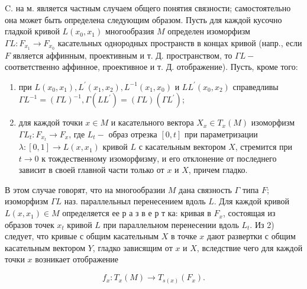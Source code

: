 \documentclass[10pt]{article}
\begin{document}
C. на м. является частным случаем общего понятия связности; самостоятельно она может быть определена следующим образом. Пусть для каждой кусочно гладкой кривой $L\left(x_{0}, x_{1}\right)$ многообразия $M$ определен изоморфизм $\Gamma L: F_{x_{1}} \rightarrow F_{x_{0}}$ касательных однородных пространств в концах кривой (напр., если $F$ является аффинным, проективным и т. Д. пространством, то $\Gamma L-$ соответственно аффинное, проективное и т. Д. отображение). Пусть, кроме того:



\begin{enumerate}

  \item при $L\left(x_{0}, x_{1}\right), L^{\prime}\left(x_{1}, x_{2}\right), L^{-1}\left(x_{1}, x_{0}\right)$ и $L L^{\prime}\left(x_{0}, x_{2}\right)$ справедливы $\Gamma L^{-1}=(\Gamma L)^{-1}, \Gamma\left(L L^{\prime}\right)=(\Gamma L)\left(\Gamma L^{\prime}\right)$;



  \item для каждой точки $x \in M$ и касательного вектора $X_{x} \in T_{x}(M)$ изоморфизм $\Gamma L_{t}: F_{x_{t}} \rightarrow F_{x}$, где $L_{t}-$ образ отрезка $[0, t]$ при параметризации $\lambda:[0,1] \rightarrow L\left(x, x_{1}\right)$ кривой $L$ с касательным вектором $X$, стремится при $t \rightarrow 0$ к тождественному изоморфизму, и его отклонение от последнего зависит в своей главной части только от $x$ и $X$, причем гладко.



\end{enumerate}



В этом случае говорят, что на многообразии $M$ дана связность $\Gamma$ типа $F$; изоморфизм $\Gamma L$ наз. параллельныл перенесением вдоль $L$. Для каждой кривой $L\left(x, x_{1}\right) \in M$ определяется ее р а з в е р т ка: кривая в $F_{x}$, состоящая из образов точек $x_{t}$ кривой $L$ при параллельном перенесении вдоль $L_{t}$. Из 2) следует, что кривые с общим касательным $X$ в точке $x$ дают развертки с общим касательным вектором $Y$, гладко зависящим от $x$ и $X$, вследствие чего для каждой точки $x$ возникает отображение



\[

f_{x}: T_{x}(M) \rightarrow T_{s(x)}\left(F_{x}\right) .

\]
\end{document}
